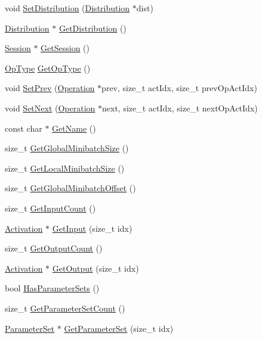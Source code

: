 \begin{DoxyCompactItemize}
\item 
void \hyperlink{classMLSL_1_1Operation_a1712a9b9d34b60d8323370f1cf5b7aa1}{Set\-Distribution} (\hyperlink{classMLSL_1_1Distribution}{Distribution} $\ast$dist)
\item 
\hyperlink{classMLSL_1_1Distribution}{Distribution} $\ast$ \hyperlink{classMLSL_1_1Operation_aa8343c64cb4306d990e54a7fcad772e6}{Get\-Distribution} ()
\item 
\hyperlink{classMLSL_1_1Session}{Session} $\ast$ \hyperlink{classMLSL_1_1Operation_a44ae77acd2eff8cad2187bb8d7834ae1}{Get\-Session} ()
\item 
\hyperlink{namespaceMLSL_a1366e5621278eafc7ecb03de012824bf}{Op\-Type} \hyperlink{classMLSL_1_1Operation_a4bb9790bbbec02e5fbbe8388077d8ec2}{Get\-Op\-Type} ()
\item 
void \hyperlink{classMLSL_1_1Operation_aaba248e9778f276502025d24f09c75d7}{Set\-Prev} (\hyperlink{classMLSL_1_1Operation}{Operation} $\ast$prev, size\-\_\-t act\-Idx, size\-\_\-t prev\-Op\-Act\-Idx)
\item 
void \hyperlink{classMLSL_1_1Operation_a8213acc517e27f003672f88fa6c8269d}{Set\-Next} (\hyperlink{classMLSL_1_1Operation}{Operation} $\ast$next, size\-\_\-t act\-Idx, size\-\_\-t next\-Op\-Act\-Idx)
\item 
const char $\ast$ \hyperlink{classMLSL_1_1Operation_aca149f1cb4b8450eeddc6a4553e04eb8}{Get\-Name} ()
\item 
size\-\_\-t \hyperlink{classMLSL_1_1Operation_ad3a81ee368247243dd086c21ad92e568}{Get\-Global\-Minibatch\-Size} ()
\item 
size\-\_\-t \hyperlink{classMLSL_1_1Operation_a46dc40ed633ebd52600e1b2152db3817}{Get\-Local\-Minibatch\-Size} ()
\item 
size\-\_\-t \hyperlink{classMLSL_1_1Operation_a8a795140345c41a4ced5131e2287cee6}{Get\-Global\-Minibatch\-Offset} ()
\item 
size\-\_\-t \hyperlink{classMLSL_1_1Operation_aefeaabeb5deab853988bd5bcdae72f6f}{Get\-Input\-Count} ()
\item 
\hyperlink{classMLSL_1_1Activation}{Activation} $\ast$ \hyperlink{classMLSL_1_1Operation_aaeba9cab82a79a6e0e07784abfa20333}{Get\-Input} (size\-\_\-t idx)
\item 
size\-\_\-t \hyperlink{classMLSL_1_1Operation_a8c7d5ceff10ba35e6e4f609fedb3294e}{Get\-Output\-Count} ()
\item 
\hyperlink{classMLSL_1_1Activation}{Activation} $\ast$ \hyperlink{classMLSL_1_1Operation_ae57fff06168ae2a0b2119553306502a0}{Get\-Output} (size\-\_\-t idx)
\item 
bool \hyperlink{classMLSL_1_1Operation_af3a217382484434007bef864c7eb4bab}{Has\-Parameter\-Sets} ()
\item 
size\-\_\-t \hyperlink{classMLSL_1_1Operation_a7748a921c07f896c4c7ade28498b1bb3}{Get\-Parameter\-Set\-Count} ()
\item 
\hyperlink{classMLSL_1_1ParameterSet}{Parameter\-Set} $\ast$ \hyperlink{classMLSL_1_1Operation_a78b43c78af0ecbbc95d9250d3d329e37}{Get\-Parameter\-Set} (size\-\_\-t idx)
\end{DoxyCompactItemize}


